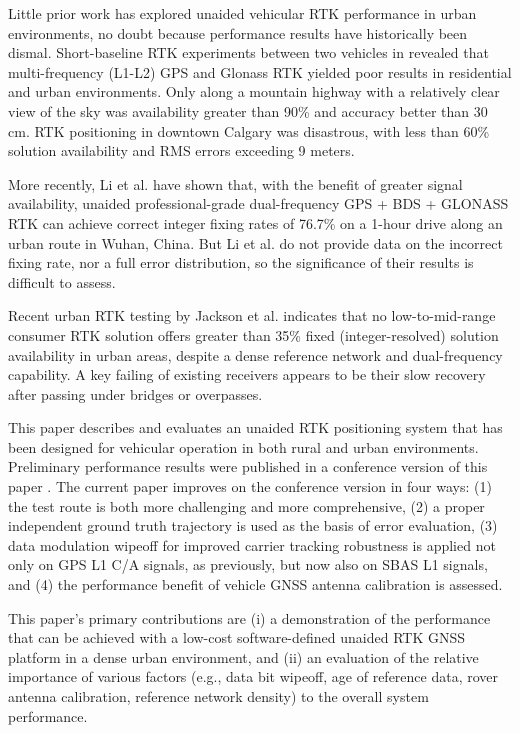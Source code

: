 \documentclass[10pt,journal,twocolumn]{IEEEtran} %
\begin{document}
Little prior work has explored unaided vehicular RTK performance in urban
environments, no doubt because performance results have historically been
dismal. Short-baseline RTK experiments between two vehicles in
\cite{ong2009assessment} revealed that multi-frequency (L1-L2) GPS and Glonass
RTK yielded poor results in residential and urban environments.  Only along a
mountain highway with a relatively clear view of the sky was availability
greater than 90\% and accuracy better than 30 cm.  RTK positioning in downtown
Calgary was disastrous, with less than 60\% solution availability and RMS
errors exceeding 9 meters.

More recently, Li et al. \cite{li2018high} have shown that, with the benefit
of greater signal availability, unaided professional-grade dual-frequency GPS
+ BDS + GLONASS RTK can achieve correct integer fixing rates of 76.7\% on a
1-hour drive along an urban route in Wuhan, China.  But Li et al. do not
provide data on the incorrect fixing rate, nor a full error distribution, so
the significance of their results is difficult to assess.

Recent urban RTK testing by Jackson et al. \cite{jackson2018assessmentRtk}
indicates that no low-to-mid-range consumer RTK solution offers greater than
35\% fixed (integer-resolved) solution availability in urban areas, despite a
dense reference network and dual-frequency capability.  A key failing of
existing receivers appears to be their slow recovery after passing under
bridges or overpasses.

This paper describes and evaluates an unaided RTK positioning system that has
been designed for vehicular operation in both rural and urban environments.
Preliminary performance results were published in a conference version of this
paper \cite{humphreys2018urbanStandAloneRTKplans2018}.  The current paper
improves on the conference version in four ways: (1) the test route is both
more challenging and more comprehensive, (2) a proper independent ground truth
trajectory is used as the basis of error evaluation, (3) data modulation
wipeoff for improved carrier tracking robustness is applied not only on GPS L1
C/A signals, as previously, but now also on SBAS L1 signals, and (4) the
performance benefit of vehicle GNSS antenna calibration is assessed.

This paper's primary contributions are (i) a demonstration of the performance
that can be achieved with a low-cost software-defined unaided RTK GNSS
platform in a dense urban environment, and (ii) an evaluation of the relative
importance of various factors (e.g., data bit wipeoff, age of reference data,
rover antenna calibration, reference network density) to the overall system
performance.
\end{document}
